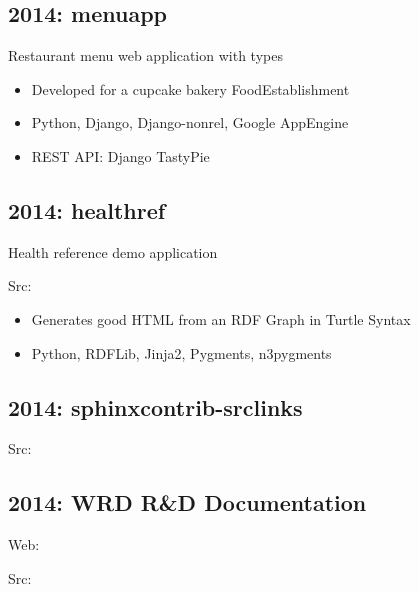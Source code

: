 \documentclass[letter,,openany,oneside,english]{sphinxhowto}
\begin{document}
\subsection{2014: menuapp}
\label{\detokenize{resume:menuapp}}
\begin{DUlineblock}{0em}
\item[] Restaurant menu web application with  types
\end{DUlineblock}
\begin{itemize}
\item {} 
Developed for a cupcake bakery FoodEstablishment

\item {} 
Python, Django, Django-nonrel, Google AppEngine

\item {} 
REST API: Django TastyPie

\end{itemize}


\subsection{2014: healthref}
\label{\detokenize{resume:healthref}}
\begin{DUlineblock}{0em}
\item[] Health reference demo application
\item[] Src: 
\end{DUlineblock}
\begin{itemize}
\item {} 
Generates good HTML from an RDF Graph in Turtle Syntax

\item {} 
Python, RDFLib, Jinja2, Pygments, n3pygments

\end{itemize}


\subsection{2014: sphinxcontrib-srclinks}
\label{\detokenize{resume:sphinxcontrib-srclinks}}
\begin{DUlineblock}{0em}
\item[] Src: 
\end{DUlineblock}


\subsection{2014: WRD R\&D Documentation}
\label{\detokenize{resume:wrd-r-d-documentation}}
\begin{DUlineblock}{0em}
\item[] Web: 
\item[] Src: 
\end{DUlineblock}
\end{document}
